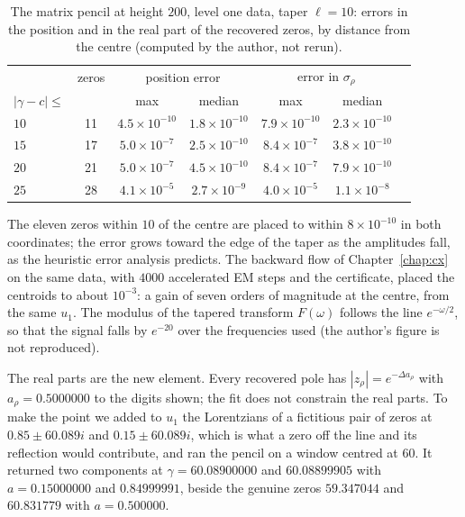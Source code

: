 \begin{table}[ht]
\centering
\small
\begin{tabular}{lcccccc}
\toprule
& zeros & \multicolumn{2}{c}{position error} & \multicolumn{2}{c}{error in $\sigma_\rho$}\\
$|\gamma-c|\le$ & & max & median & max & median\\
\midrule
$10$ & 11 & $4.5\times10^{-10}$ & $1.8\times10^{-10}$ & $7.9\times10^{-10}$ & $2.3\times10^{-10}$\\
$15$ & 17 & $5.0\times10^{-7}$ & $2.5\times10^{-10}$ & $8.4\times10^{-7}$ & $3.8\times10^{-10}$\\
$20$ & 21 & $5.0\times10^{-7}$ & $4.5\times10^{-10}$ & $8.4\times10^{-7}$ & $7.9\times10^{-10}$\\
$25$ & 28 & $4.1\times10^{-5}$ & $2.7\times10^{-9}$ & $4.0\times10^{-5}$ & $1.1\times10^{-8}$\\
\bottomrule
\end{tabular}
\caption{The matrix pencil at height $200$, level one data, taper $\ell=10$: errors in the position and in the real part of the recovered zeros, by distance from the centre (computed by the author, not rerun).}\label{es:tab:height200}
\end{table}

\noindent The eleven zeros within $10$ of the centre are placed to within $8\times10^{-10}$ in both coordinates; the error grows toward the edge of the taper as the amplitudes fall, as the heuristic error analysis predicts. The backward flow of Chapter~\ref{chap:cx} on the same data, with $4000$ accelerated EM steps and the certificate, placed the centroids to about $10^{-3}$: a gain of seven orders of magnitude at the centre, from the same $u_1$. The modulus of the tapered transform $F(\omega)$ follows the line $e^{-\omega/2}$, so that the signal falls by $e^{-20}$ over the frequencies used (the author's figure is not reproduced).

The real parts are the new element. Every recovered pole has $|z_\rho|=e^{-\Delta a_\rho}$ with $a_\rho=0.5000000$ to the digits shown; the fit does not constrain the real parts. To make the point we added to $u_1$ the Lorentzians of a fictitious pair of zeros at $0.85\pm60.089i$ and $0.15\pm60.089i$, which is what a zero off the line and its reflection would contribute, and ran the pencil on a window centred at $60$. It returned two components at $\gamma=60.08900000$ and $60.08899905$ with $a=0.15000000$ and $0.84999991$, beside the genuine zeros $59.347044$ and $60.831779$ with $a=0.500000$.

